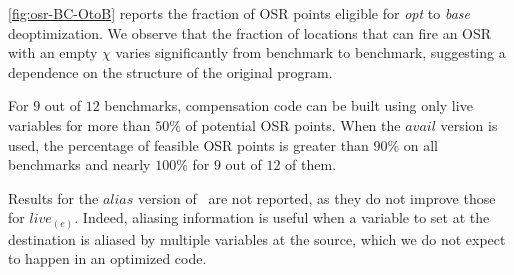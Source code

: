 \myfigure\ref{fig:osr-BC-OtoB} reports the fraction of OSR points eligible for {\em opt} to {\em base} deoptimization. We observe that the fraction of locations that can fire an OSR with an empty $\chi$ varies significantly from benchmark to benchmark, suggesting a dependence on the structure of the original program.

For $9$ out of $12$ benchmarks, compensation code can be built using only live variables for more than $50\%$ of potential OSR points.
When the $avail$ version is used, the percentage of feasible OSR points is greater than $90\%$ on all benchmarks and nearly $100\%$ for $9$ out of $12$ of them.

Results for the $alias$ version of \reconstruct\ are not reported, as they do not improve those for $live_{(e)}$. Indeed, aliasing information is useful when a variable to set at the destination is aliased by multiple variables at the source, which we do not expect to happen in an optimized code.

